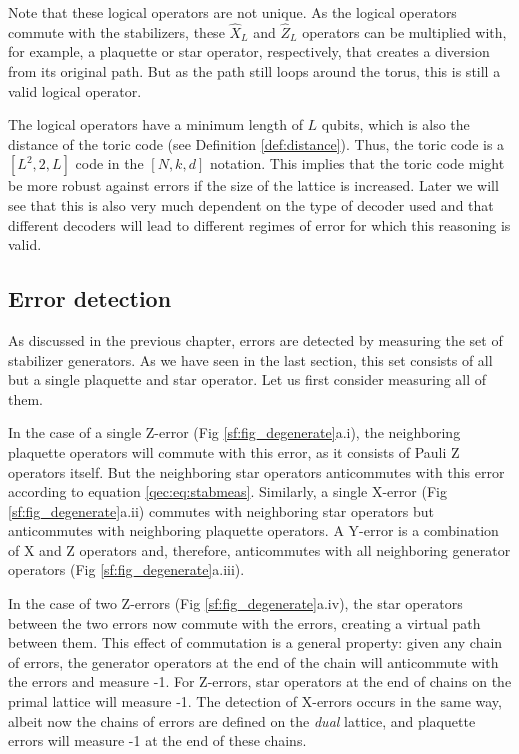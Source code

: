 Note that these logical operators are not unique. As the logical operators commute with the stabilizers, these $\hat{X}_L$ and $\hat{Z}_L$ operators can be multiplied with, for example, a plaquette or star operator, respectively, that creates a diversion from its original path. But as the path still loops around the torus, this is still a valid logical operator.

The logical operators have a minimum length of $L$ qubits, which is also the distance of the toric code (see Definition \ref{def:distance}). Thus, the toric code is a $[L^2,2,L]$ code in the $[N,k,d]$ notation. This implies that the toric code might be more robust against errors if the size of the lattice is increased. Later we will see that this is also very much dependent on the type of decoder used and that different decoders will lead to different regimes of error for which this reasoning is valid.


\subsection{Error detection}
As discussed in the previous chapter, errors are detected by measuring the set of stabilizer generators. As we have seen in the last section, this set consists of all but a single plaquette and star operator. Let us first consider measuring all of them.

In the case of a single Z-error (Fig \ref{sf:fig_degenerate}a.i), the neighboring plaquette operators will commute with this error, as it consists of Pauli Z operators itself. But the neighboring star operators anticommutes with this error according to equation \eqref{qec:eq:stabmeas}. Similarly, a single X-error (Fig \ref{sf:fig_degenerate}a.ii) commutes with neighboring star operators but anticommutes with neighboring plaquette operators. A Y-error is a combination of X and Z operators and, therefore, anticommutes with all neighboring generator operators (Fig \ref{sf:fig_degenerate}a.iii).

In the case of two Z-errors (Fig \ref{sf:fig_degenerate}a.iv), the star operators between the two errors now commute with the errors, creating a virtual path between them. This effect of commutation is a general property: given any chain of errors, the generator operators at the end of the chain will anticommute with the errors and measure -1. For Z-errors, star operators at the end of chains on the primal lattice will measure -1. The detection of X-errors occurs in the same way, albeit now the chains of errors are defined on the \emph{dual} lattice, and plaquette errors will measure -1 at the end of these chains.

